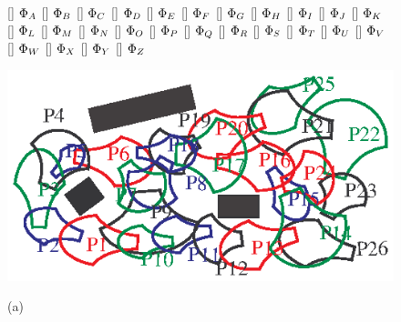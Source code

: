 \begin{figure}[bt]
  \centering 
\begin{minipage}{0.85\linewidth}
  \centering 
{}[]{\textcolor{red}{ $\Phi_A$}}
[]{\textcolor{blue}{ $\Phi_B$}}
[]{\textcolor{DarkGreen}{ $\Phi_C$}}
[]{\textcolor{black}{ $\Phi_D$}}
[]{\textcolor{blue}{ $\Phi_E$}}
[]{\textcolor{red}{ $\Phi_F$}}
[]{\textcolor{DarkGreen}{ $\Phi_G$}}
[]{\textcolor{blue}{ $\Phi_H$}}
[]{\textcolor{black}{ $\Phi_I$}}
[]{\textcolor{DarkGreen}{ $\Phi_J$}}
[]{\textcolor{blue}{ $\Phi_K$}}
[]{\textcolor{black}{ $\Phi_L$}}
[]{\textcolor{red}{ $\Phi_M$}}
[]{\textcolor{DarkGreen}{ $\Phi_N$}}
[]{\textcolor{blue}{ $\Phi_O$}}
[]{\textcolor{red}{ $\Phi_P$}}
[]{\textcolor{DarkGreen}{ $\Phi_Q$}}
[]{\textcolor{blue}{ $\Phi_R$}}
[]{\textcolor{black}{ $\Phi_S$}}
[]{\textcolor{red}{ $\Phi_T$}}
[]{\textcolor{black}{ $\Phi_U$}}
[]{\textcolor{DarkGreen}{ $\Phi_V$}}
[]{\textcolor{black}{ $\Phi_W$}}
[]{\textcolor{red}{ $\Phi_X$}}
[]{\textcolor{DarkGreen}{ $\Phi_Y$}}
[]{\textcolor{black}{ $\Phi_Z$}}

  \includegraphics[width=\linewidth]{graphics/collection2D.eps} 

{\footnotesize (a)}
\end{minipage}



\end{figure}
